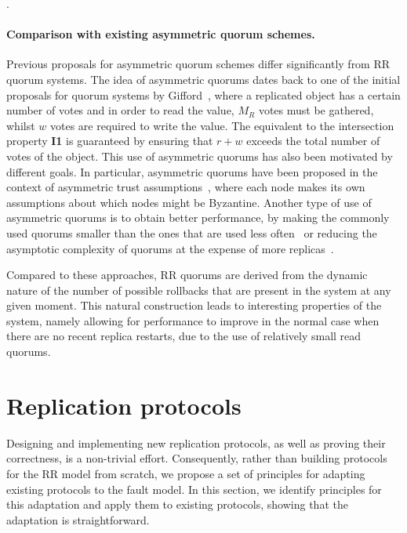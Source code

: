 .

\paragraph{Comparison with existing asymmetric quorum schemes.}

Previous proposals for asymmetric quorum schemes differ
significantly from \ac{RR} quorum systems.  The idea of
asymmetric quorums dates back to one of the initial proposals for
quorum systems by Gifford~\cite{weighted_voting}, where a
replicated object has a certain number of votes and in order to
read the value, $M_R$ votes must be gathered, whilst $w$ votes
are required to write the value. The equivalent to the
intersection property \textbf{I1} is guaranteed by ensuring that
$r + w$ exceeds the total number of votes of the object. This use
of asymmetric quorums has also been motivated by different goals.
In particular, asymmetric quorums have been proposed in the
context of asymmetric trust assumptions~\cite{asymmetric_trust},
where each node makes its own assumptions about which nodes might
be Byzantine. Another type of use of asymmetric quorums is to
obtain better performance, by making the commonly used quorums
smaller than the ones that are used less
often~\cite{fp,wheat,rqs} or reducing the asymptotic complexity
of quorums at the expense of more replicas~\cite{grid_quorums}.

Compared to these approaches, \ac{RR} quorums are derived from
the dynamic nature of the number of possible rollbacks that are
present in the system at any given moment. This natural
construction leads to interesting properties of the system,
namely allowing for performance to improve in the normal case
when there are no recent replica restarts, due to the use of
relatively small read quorums.

\section{Replication protocols}\label{sec:protocol}

Designing and implementing new replication protocols, as well as
proving their correctness, is a non-trivial effort. Consequently,
rather than building protocols for the \ac{RR} model from
scratch, we propose a set of principles for adapting existing
protocols to the fault model. In this section, we identify
principles for this adaptation and apply them to existing
protocols, showing that the adaptation is straightforward.

